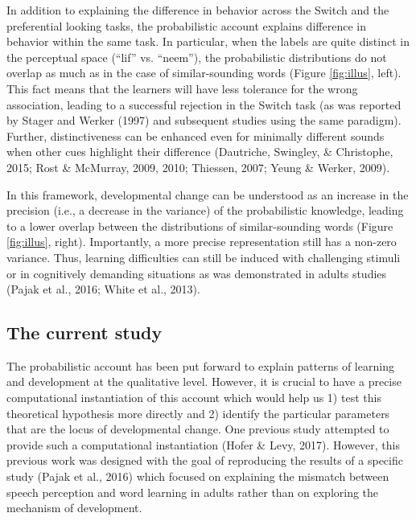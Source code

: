 \documentclass[english,,man,floatsintext]{apa6}
\theoremstyle{definition}
\theoremstyle{definition}
\theoremstyle{definition}
\theoremstyle{remark}
\begin{document}
In addition to explaining the difference in behavior across the Switch
and the preferential looking tasks, the probabilistic account explains
difference in behavior within the same task. In particular, when the
labels are quite distinct in the perceptual space (\enquote{lif} vs.
\enquote{neem}), the probabilistic distributions do not overlap as much
as in the case of similar-sounding words (Figure \ref{fig:illus}, left).
This fact means that the learners will have less tolerance for the wrong
association, leading to a successful rejection in the Switch task (as
was reported by Stager and Werker (1997) and subsequent studies using
the same paradigm). Further, distinctiveness can be enhanced even for
minimally different sounds when other cues highlight their difference
(Dautriche, Swingley, \& Christophe, 2015; Rost \& McMurray, 2009, 2010;
Thiessen, 2007; Yeung \& Werker, 2009).

In this framework, developmental change can be understood as an increase
in the precision (i.e., a decrease in the variance) of the probabilistic
knowledge, leading to a lower overlap between the distributions of
similar-sounding words (Figure \ref{fig:illus}, right). Importantly, a
more precise representation still has a non-zero variance. Thus,
learning difficulties can still be induced with challenging stimuli or
in cognitively demanding situations as was demonstrated in adults
studies (Pajak et al., 2016; White et al., 2013).

\subsection{The current study}\label{the-current-study}

The probabilistic account has been put forward to explain patterns of
learning and development at the qualitative level. However, it is
crucial to have a precise computational instantiation of this account
which would help us 1) test this theoretical hypothesis more directly
and 2) identify the particular parameters that are the locus of
developmental change. One previous study attempted to provide such a
computational instantiation (Hofer \& Levy, 2017). However, this
previous work was designed with the goal of reproducing the results of a
specific study (Pajak et al., 2016) which focused on explaining the
mismatch between speech perception and word learning in adults rather
than on exploring the mechanism of development.
\end{document}
